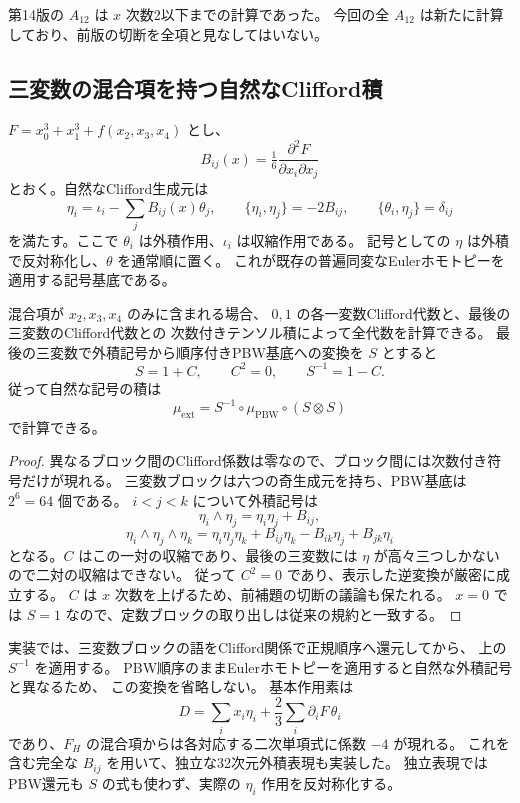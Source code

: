 第14版の $A_{12}$ は $x$ 次数2以下までの計算であった。
今回の全 $A_{12}$ は新たに計算しており、前版の切断を全項と見なしてはいない。

\subsection{三変数の混合項を持つ自然なClifford積}

$F=x_0^3+x_1^3+f(x_2,x_3,x_4)$ とし、
\[
 B_{ij}(x)=\tfrac16\frac{\partial^2F}{\partial x_i\partial x_j}
\]
とおく。自然なClifford生成元は
\[
 \eta_i=\iota_i-\sum_jB_{ij}(x)\theta_j,
 \qquad \{\eta_i,\eta_j\}=-2B_{ij},\qquad
 \{\theta_i,\eta_j\}=\delta_{ij}
\]
を満たす。ここで $\theta_i$ は外積作用、$\iota_i$ は収縮作用である。
記号としての $\eta$ は外積で反対称化し、$\theta$ を通常順に置く。
これが既存の普遍同変なEulerホモトピーを適用する記号基底である。

\begin{lemma}[Hesse型の外積記号とPBW基底]
\label{lem:v15-hesse-symbol-product}
混合項が $x_2,x_3,x_4$ のみに含まれる場合、
$0,1$ の各一変数Clifford代数と、最後の三変数のClifford代数との
次数付きテンソル積によって全代数を計算できる。
最後の三変数で外積記号から順序付きPBW基底への変換を $S$ とすると
\[
 S=1+C,\qquad C^2=0,\qquad S^{-1}=1-C.
\]
従って自然な記号の積は
\[
 \mu_{\mathrm{ext}}=S^{-1}\circ\mu_{\mathrm{PBW}}\circ(S\otimes S)
\]
で計算できる。
\end{lemma}

\begin{proof}
異なるブロック間のClifford係数は零なので、ブロック間には次数付き符号だけが現れる。
三変数ブロックは六つの奇生成元を持ち、PBW基底は $2^6=64$ 個である。
$i<j<k$ について外積記号は
\[
 \eta_i\wedge\eta_j=\eta_i\eta_j+B_{ij},
\]
\[
 \eta_i\wedge\eta_j\wedge\eta_k
  =\eta_i\eta_j\eta_k+B_{ij}\eta_k-B_{ik}\eta_j+B_{jk}\eta_i
\]
となる。$C$ はこの一対の収縮であり、最後の三変数には
$\eta$ が高々三つしかないので二対の収縮はできない。
従って $C^2=0$ であり、表示した逆変換が厳密に成立する。
$C$ は $x$ 次数を上げるため、前補題の切断の議論も保たれる。
$x=0$ では $S=1$ なので、定数ブロックの取り出しは従来の規約と一致する。
\end{proof}

実装では、三変数ブロックの語をClifford関係で正規順序へ還元してから、
上の $S^{-1}$ を適用する。
PBW順序のままEulerホモトピーを適用すると自然な外積記号と異なるため、
この変換を省略しない。
基本作用素は
\[
 D=\sum_i x_i\eta_i+\frac23\sum_i\partial_iF\,\theta_i
\]
であり、$F_H$ の混合項からは各対応する二次単項式に係数 $-4$ が現れる。
これを含む完全な $B_{ij}$ を用いて、独立な32次元外積表現も実装した。
独立表現ではPBW還元も $S$ の式も使わず、実際の $\eta_i$ 作用を反対称化する。

